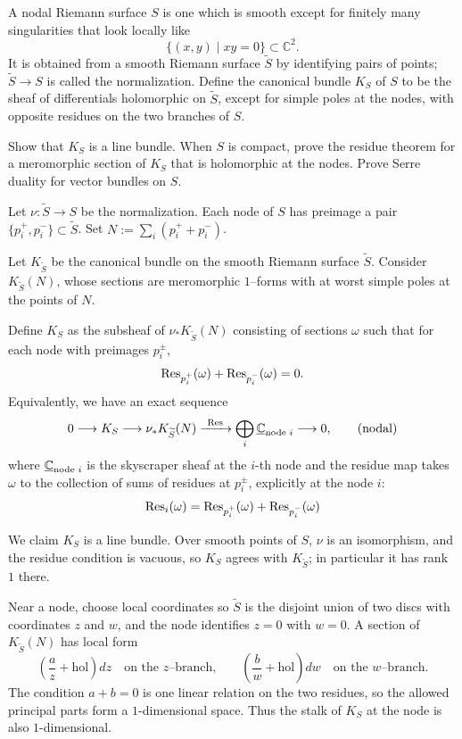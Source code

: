 \documentclass[12pt]{article}
\begin{document}
\begin{exercise}
A nodal Riemann surface $S$ is one which is smooth except for finitely many singularities that look locally like
\[
\{(x, y) \mid xy = 0\} \subset \mathbb{C}^2.
\]
It is obtained from a smooth Riemann surface $\widetilde{S}$ by identifying pairs of points; $\widetilde{S} \to S$ is called the normalization. Define the canonical bundle $K_S$ of $S$ to be the sheaf of differentials holomorphic on $\widetilde{S}$, except for simple poles at the nodes, with opposite residues on the two branches of $S$.

Show that $K_S$ is a line bundle. When $S$ is compact, prove the residue theorem for a meromorphic section of $K_S$ that is holomorphic at the nodes. Prove Serre duality for vector bundles on $S$.
\end{exercise}
\begin{solution}
    Let $\nu:\widetilde S\to S$ be the normalization.
Each node of $S$ has preimage a pair $\{p_i^+,p_i^-\}\subset\widetilde S$.
Set $N:=\sum_i(p_i^++p_i^-)$.

Let $K_{\widetilde S}$ be the canonical bundle on the smooth Riemann surface
$\widetilde S$. Consider $K_{\widetilde S}(N)$, whose sections are meromorphic $1$--forms
with at worst simple poles at the points of $N$.

Define $K_S$ as the subsheaf of $\nu_*K_{\widetilde S}(N)$ consisting of
sections $\omega$ such that for each node with preimages $p_i^\pm$,
\[
\operatorname{Res}_{p_i^+}(\omega)+\operatorname{Res}_{p_i^-}(\omega)=0.
\]
Equivalently, we have an exact sequence
\[
0\longrightarrow K_S\longrightarrow \nu_*K_{\widetilde S}(N)
\xrightarrow{\ \mathrm{Res}\ } \bigoplus_i \underline{\mathbb{C}}_{\text{node }i}
\longrightarrow 0,
\tag{nodal}
\label{nodal}
\]
where $\underline{\mathbb{C}}_{\text{node }i}$ is the skyscraper sheaf at the $i$-th node and the residue map takes
$\omega$ to the collection of sums of residues at $p_i^\pm$, explicitly at the node $i$:
\[\mathrm{Res}_i(\omega) = \operatorname{Res}_{p_i^+}(\omega) + \operatorname{Res}_{p_i^-}(\omega)\]


We claim $K_S$ is a line bundle.
Over smooth points of $S$, $\nu$ is an isomorphism, and the residue condition
is vacuous, so $K_S$ agrees with $K_{\widetilde S}$; in particular it has
rank $1$ there.

Near a node, choose local coordinates so $\widetilde S$ is the disjoint
union of two discs with coordinates $z$ and $w$, and the node identifies
$z=0$ with $w=0$. A section of $K_{\widetilde S}(N)$ has local form
\[
\left(\frac{a}{z}+\text{hol}\right)dz
\quad\text{on the $z$--branch,}\qquad
\left(\frac{b}{w}+\text{hol}\right)dw
\quad\text{on the $w$--branch.}
\]
The condition $a+b=0$ is one linear relation on the two residues, so the
allowed principal parts form a $1$-dimensional space. Thus the stalk of
$K_S$ at the node is also $1$-dimensional.



\end{solution}
\end{document}
